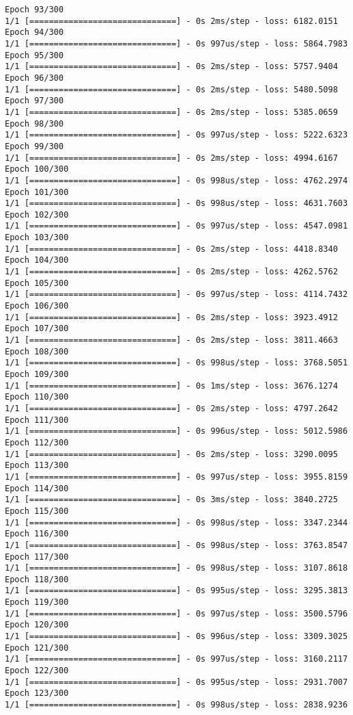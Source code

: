 \documentclass[11pt]{article}
\begin{document}
\begin{Verbatim}[commandchars=\\\{\}]
Epoch 93/300
1/1 [==============================] - 0s 2ms/step - loss: 6182.0151
Epoch 94/300
1/1 [==============================] - 0s 997us/step - loss: 5864.7983
Epoch 95/300
1/1 [==============================] - 0s 2ms/step - loss: 5757.9404
Epoch 96/300
1/1 [==============================] - 0s 2ms/step - loss: 5480.5098
Epoch 97/300
1/1 [==============================] - 0s 2ms/step - loss: 5385.0659
Epoch 98/300
1/1 [==============================] - 0s 997us/step - loss: 5222.6323
Epoch 99/300
1/1 [==============================] - 0s 2ms/step - loss: 4994.6167
Epoch 100/300
1/1 [==============================] - 0s 998us/step - loss: 4762.2974
Epoch 101/300
1/1 [==============================] - 0s 998us/step - loss: 4631.7603
Epoch 102/300
1/1 [==============================] - 0s 997us/step - loss: 4547.0981
Epoch 103/300
1/1 [==============================] - 0s 2ms/step - loss: 4418.8340
Epoch 104/300
1/1 [==============================] - 0s 2ms/step - loss: 4262.5762
Epoch 105/300
1/1 [==============================] - 0s 997us/step - loss: 4114.7432
Epoch 106/300
1/1 [==============================] - 0s 2ms/step - loss: 3923.4912
Epoch 107/300
1/1 [==============================] - 0s 2ms/step - loss: 3811.4663
Epoch 108/300
1/1 [==============================] - 0s 998us/step - loss: 3768.5051
Epoch 109/300
1/1 [==============================] - 0s 1ms/step - loss: 3676.1274
Epoch 110/300
1/1 [==============================] - 0s 2ms/step - loss: 4797.2642
Epoch 111/300
1/1 [==============================] - 0s 996us/step - loss: 5012.5986
Epoch 112/300
1/1 [==============================] - 0s 2ms/step - loss: 3290.0095
Epoch 113/300
1/1 [==============================] - 0s 997us/step - loss: 3955.8159
Epoch 114/300
1/1 [==============================] - 0s 3ms/step - loss: 3840.2725
Epoch 115/300
1/1 [==============================] - 0s 998us/step - loss: 3347.2344
Epoch 116/300
1/1 [==============================] - 0s 998us/step - loss: 3763.8547
Epoch 117/300
1/1 [==============================] - 0s 998us/step - loss: 3107.8618
Epoch 118/300
1/1 [==============================] - 0s 995us/step - loss: 3295.3813
Epoch 119/300
1/1 [==============================] - 0s 997us/step - loss: 3500.5796
Epoch 120/300
1/1 [==============================] - 0s 996us/step - loss: 3309.3025
Epoch 121/300
1/1 [==============================] - 0s 997us/step - loss: 3160.2117
Epoch 122/300
1/1 [==============================] - 0s 995us/step - loss: 2931.7007
Epoch 123/300
1/1 [==============================] - 0s 998us/step - loss: 2838.9236

\end{Verbatim}
\end{document}
